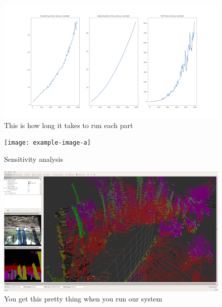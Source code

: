 \begin{figure}
    \centering
    \includegraphics[width=\textwidth]{figs/results/timing.png}
    \caption{This is how long it takes to run each part}
    \label{fig:timing}
\end{figure}

\begin{figure}
    \centering
    \texttt{[image: example-image-a]}
    \caption{Sensitivity analysis}
    \label{fig:sensetivity}
\end{figure}

\begin{figure}
    \centering
    \includegraphics[width=\textwidth]{figs/results/semantic_mapping.png}
    \caption{You get this pretty thing when you run our system}
    \label{fig:pretty_thing}
\end{figure}